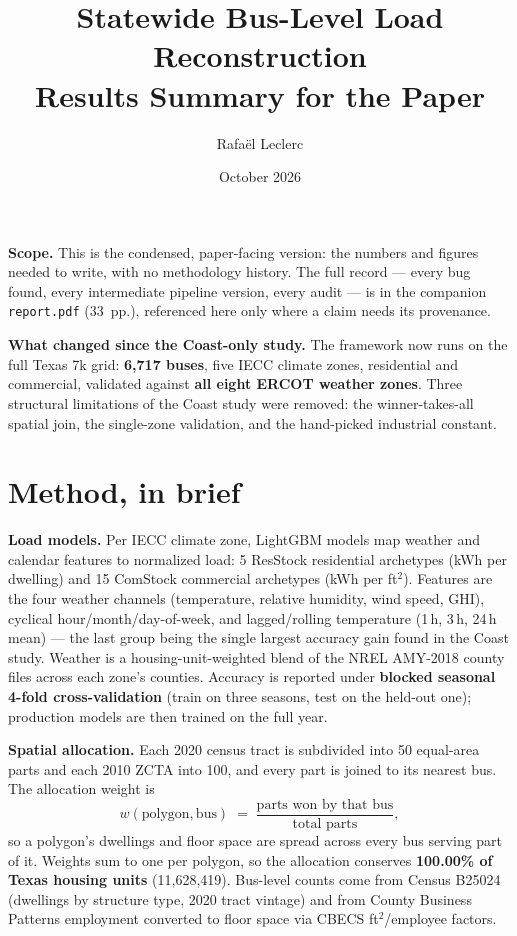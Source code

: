\documentclass[11pt]{article}
\title{\vspace{-2em}Statewide Bus-Level Load Reconstruction\\[0.2em]
\large Results Summary for the Paper}
\author{Rafa\"el Leclerc}
\date{October 2026}
\begin{document}
\maketitle
\vspace{-2em}

\noindent\textbf{Scope.} This is the condensed, paper-facing version: the numbers and figures
needed to write, with no methodology history. The full record --- every bug found, every
intermediate pipeline version, every audit --- is in the companion \texttt{report.pdf}
(33~pp.), referenced here only where a claim needs its provenance.

\noindent\textbf{What changed since the Coast-only study.} The framework now runs on the full
Texas 7k grid: \textbf{6{,}717 buses}, five IECC climate zones, residential and commercial,
validated against \textbf{all eight ERCOT weather zones}. Three structural limitations of the
Coast study were removed: the winner-takes-all spatial join, the single-zone validation, and the
hand-picked industrial constant.

\section{Method, in brief}

\textbf{Load models.} Per IECC climate zone, LightGBM models map weather and calendar features to
normalized load: 5 ResStock residential archetypes (kWh per dwelling) and 15 ComStock commercial
archetypes (kWh per ft$^2$). Features are the four weather channels (temperature, relative
humidity, wind speed, GHI), cyclical hour/month/day-of-week, and lagged/rolling temperature
(1\,h, 3\,h, 24\,h mean) --- the last group being the single largest accuracy gain found in the
Coast study. Weather is a housing-unit-weighted blend of the NREL AMY-2018 county files across
each zone's counties. Accuracy is reported under \textbf{blocked seasonal 4-fold
cross-validation} (train on three seasons, test on the held-out one); production models are then
trained on the full year.

\textbf{Spatial allocation.} Each 2020 census tract is subdivided into 50 equal-area parts and
each 2010 ZCTA into 100, and every part is joined to its nearest bus. The allocation weight is
\[
w(\text{polygon},\text{bus}) \;=\; \frac{\text{parts won by that bus}}{\text{total parts}},
\]
so a polygon's dwellings and floor space are spread across every bus serving part of it. Weights
sum to one per polygon, so the allocation conserves \textbf{100.00\% of Texas housing units}
(11{,}628{,}419). Bus-level counts come from Census B25024 (dwellings by structure type, 2020
tract vintage) and from County Business Patterns employment converted to floor space via
CBECS ft$^2$/employee factors.
\end{document}
